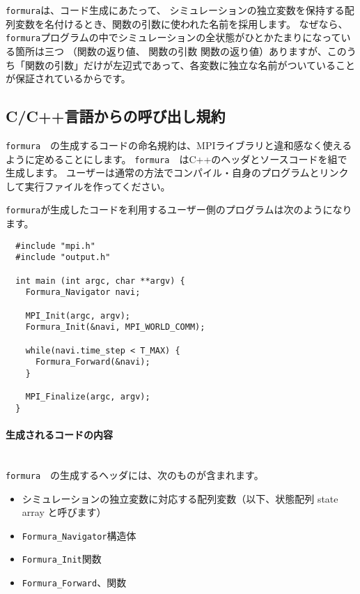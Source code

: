 \documentclass{jsarticle}
\newcommand{\formura}{{\texttt{formura}}}
\begin{document}
\formura は、コード生成にあたって、
シミュレーションの独立変数を保持する配列変数を名付けるとき、関数の引数に使われた名前を採用します。
なぜなら、\formura プログラムの中でシミュレーションの全状態がひとかたまりになっている箇所は三つ
（関数の返り値、
関数の引数
関数の返り値）ありますが、このうち「関数の引数」だけが左辺式であって、各変数に独立な名前がついていることが保証されているからです。


\subsection{C/C++言語からの呼び出し規約}

\formura　の生成するコードの命名規約は、MPIライブラリと違和感なく使えるように定めることにします。
\formura　はC++のヘッダとソースコードを組で生成します。
ユーザーは通常の方法でコンパイル・自身のプログラムとリンクして実行ファイルを作ってください。

\formura が生成したコードを利用するユーザー側のプログラムは次のようになります。

\begin{screen}
\begin{verbatim}
  #include "mpi.h"
  #include "output.h"

  int main (int argc, char **argv) {
    Formura_Navigator navi;

    MPI_Init(argc, argv);
    Formura_Init(&navi, MPI_WORLD_COMM);

    while(navi.time_step < T_MAX) {
      Formura_Forward(&navi);
    }

    MPI_Finalize(argc, argv);
  }
\end{verbatim}
\end{screen}

\paragraph{生成されるコードの内容} \leavevmode\\


\formura　の生成するヘッダには、次のものが含まれます。

\begin{itemize}
\item シミュレーションの独立変数に対応する配列変数（以下、状態配列 state array と呼びます）
\item \verb`Formura_Navigator`構造体
\item \verb`Formura_Init`関数
\item \verb`Formura_Forward`、関数
\end{itemize}
\end{document}
